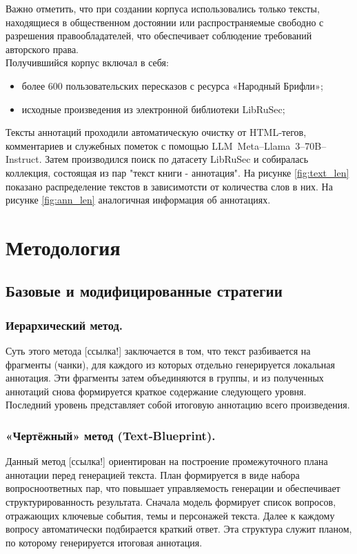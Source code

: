 \documentclass{article}
\theoremstyle{definition}
\theoremstyle{plain}
\begin{document}
Важно отметить, что при создании корпуса использовались только тексты, находящиеся в общественном достоянии или распространяемые свободно с разрешения правообладателей, что обеспечивает соблюдение требований авторского права.
\\Получившийся корпус включал в себя:
\begin{itemize}
  \item более 600 пользовательских пересказов с ресурса «Народный Брифли»;
  \item исходные произведения из электронной библиотеки LibRuSec;
\end{itemize}
Тексты аннотаций проходили автоматическую очистку от HTML‑тегов, комментариев и служебных пометок с помощью LLM~Meta--Llama~3--70B--Instruct. Затем производился поиск по датасету LibRuSec и собиралась коллекция, состоящая из пар "текст книги - аннотация".
На рисунке \ref{fig:text_len} показано распределение текстов в зависимотсти от количества слов в них. На рисунке \ref{fig:ann_len} аналогичная информация об аннотациях.

\section*{Методология}

\subsection*{Базовые и модифицированные стратегии}

\subsubsection*{Иерархический метод.}
Суть этого метода [ссылка!] заключается в том, что текст разбивается на фрагменты (чанки), для каждого из
которых отдельно генерируется локальная аннотация. 
Эти фрагменты затем объединяются в группы, и из полученных аннотаций снова формируется краткое содержание
следующего уровня. Последний уровень представляет собой итоговую аннотацию всего произведения.

\subsubsection*{«Чертёжный» метод (Text‑Blueprint).}
Данный метод [ссылка!] ориентирован на построение промежуточного
плана аннотации перед генерацией текста. План формируется в виде набора вопросноответных пар, что повышает управляемость генерации и обеспечивает структурированность результата.
Сначала модель формирует список вопросов, отражающих ключевые события, темы
и персонажей текста. Далее к каждому вопросу автоматически подбирается краткий
ответ. Эта структура служит планом, по которому генерируется итоговая аннотация.
\end{document}
